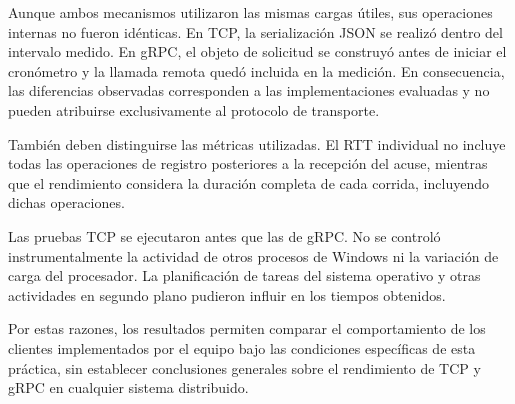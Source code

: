 Aunque ambos mecanismos utilizaron las mismas cargas útiles, sus operaciones internas no fueron idénticas. En TCP, la serialización JSON se realizó dentro del intervalo medido. En gRPC, el objeto de solicitud se construyó antes de iniciar el cronómetro y la llamada remota quedó incluida en la medición. En consecuencia, las diferencias observadas corresponden a las implementaciones evaluadas y no pueden atribuirse exclusivamente al protocolo de transporte.

También deben distinguirse las métricas utilizadas. El RTT individual no incluye todas las operaciones de registro posteriores a la recepción del acuse, mientras que el rendimiento considera la duración completa de cada corrida, incluyendo dichas operaciones.

Las pruebas TCP se ejecutaron antes que las de gRPC. No se controló instrumentalmente la actividad de otros procesos de Windows ni la variación de carga del procesador. La planificación de tareas del sistema operativo y otras actividades en segundo plano pudieron influir en los tiempos obtenidos.

Por estas razones, los resultados permiten comparar el comportamiento de los clientes implementados por el equipo bajo las condiciones específicas de esta práctica, sin establecer conclusiones generales sobre el rendimiento de TCP y gRPC en cualquier sistema distribuido.